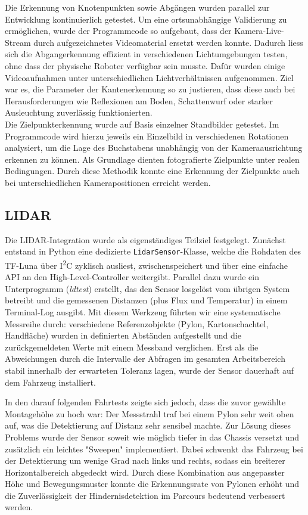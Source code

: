 \documentclass[main.tex]{subfiles} %
\begin{document}
Die Erkennung von Knotenpunkten sowie Abgängen wurden parallel zur
Entwicklung kontinuierlich getestet. Um eine ortsunabhängige Validierung zu ermöglichen,
wurde der Programmcode so aufgebaut, dass der Kamera-Live-Stream durch aufgezeichnetes
Videomaterial ersetzt werden konnte. Dadurch liess sich die
Abgangerkennung effizient in verschiedenen Lichtumgebungen testen, ohne dass der physische
Roboter verfügbar sein musste. Dafür wurden einige Videoaufnahmen unter
unterschiedlichen Lichtverhältnissen aufgenommen. Ziel war es, die Parameter der
Kantenerkennung so zu justieren, dass diese auch bei Herausforderungen wie Reflexionen am
Boden, Schattenwurf oder starker Ausleuchtung zuverlässig funktionierten.\\

Die Zielpunkterkennung wurde auf
Basis einzelner Standbilder getestet. Im Programmcode wird hierzu jeweils ein Einzelbild
in verschiedenen Rotationen analysiert, um die Lage des Buchstabens unabhängig von der
Kameraausrichtung erkennen zu können. Als Grundlage dienten fotografierte Zielpunkte
unter realen Bedingungen. Durch diese Methodik konnte eine
Erkennung der Zielpunkte auch bei unterschiedlichen Kamerapositionen erreicht werden.

\subsection*{LIDAR}
Die LIDAR-Integration wurde als eigenständiges Teilziel
festgelegt. Zunächst entstand in Python eine dedizierte
\texttt{LidarSensor}-Klasse, welche die Rohdaten des TF-Luna über
I\textsuperscript{2}C zyklisch ausliest, zwischenspeichert und über eine
einfache API an den High-Level-Controller weitergibt. Parallel dazu
wurde ein Unterprogramm (\textit{ldtest}) erstellt, das den Sensor
losgelöst vom übrigen System betreibt und die gemessenen Distanzen
(plus Flux und Temperatur) in
einem Terminal-Log ausgibt. Mit diesem Werkzeug führten wir eine
systematische Messreihe durch: verschiedene Referenzobjekte (Pylon,
Kartonschachtel, Handfläche) wurden in definierten Abständen aufgestellt
und die zurückgemeldeten Werte mit einem Messband
verglichen. Erst als die Abweichungen durch die Intervalle der
Abfragen im gesamten Arbeitsbereich stabil
innerhalb der erwarteten Toleranz lagen, wurde der Sensor dauerhaft auf
dem Fahrzeug installiert.

In den darauf folgenden Fahrtests zeigte sich jedoch, dass die zuvor
gewählte Montagehöhe zu hoch war: Der Messstrahl traf bei einem Pylon
sehr weit oben auf, was die Detektierung auf Distanz sehr sensibel machte.
Zur Lösung dieses Problems wurde der Sensor soweit wie möglich tiefer
in das Chassis versetzt und zusätzlich ein leichtes
"Sweepen" implementiert. Dabei schwenkt das Fahrzeug bei der
Detektierung um wenige Grad nach links und rechts,
sodass ein breiterer Horizontalbereich abgedeckt wird. Durch diese
Kombination aus angepasster Höhe und Bewegungsmuster konnte die
Erkennungsrate von Pylonen erhöht und die Zuverlässigkeit
der Hindernisdetektion im Parcours bedeutend verbessert werden.
\end{document}
